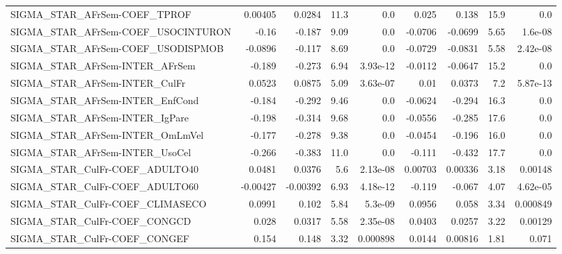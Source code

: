 \begin{tabular}{lrrrrrrrr}
SIGMA\_STAR\_AFrSem-COEF\_TPROF          &     0.00405 &       0.0284 &    11.3 &      0.0 &      0.025 &       0.138 &         15.9 &           0.0 \\
SIGMA\_STAR\_AFrSem-COEF\_USOCINTURON    &       -0.16 &       -0.187 &    9.09 &      0.0 &    -0.0706 &     -0.0699 &         5.65 &       1.6e-08 \\
SIGMA\_STAR\_AFrSem-COEF\_USODISPMOB     &     -0.0896 &       -0.117 &    8.69 &      0.0 &    -0.0729 &     -0.0831 &         5.58 &      2.42e-08 \\
SIGMA\_STAR\_AFrSem-INTER\_AFrSem        &      -0.189 &       -0.273 &    6.94 & 3.93e-12 &    -0.0112 &     -0.0647 &         15.2 &           0.0 \\
SIGMA\_STAR\_AFrSem-INTER\_CulFr         &      0.0523 &       0.0875 &    5.09 & 3.63e-07 &       0.01 &      0.0373 &          7.2 &      5.87e-13 \\
SIGMA\_STAR\_AFrSem-INTER\_EnfCond       &      -0.184 &       -0.292 &    9.46 &      0.0 &    -0.0624 &      -0.294 &         16.3 &           0.0 \\
SIGMA\_STAR\_AFrSem-INTER\_IgPare        &      -0.198 &       -0.314 &    9.68 &      0.0 &    -0.0556 &      -0.285 &         17.6 &           0.0 \\
SIGMA\_STAR\_AFrSem-INTER\_OmLmVel       &      -0.177 &       -0.278 &    9.38 &      0.0 &    -0.0454 &      -0.196 &         16.0 &           0.0 \\
SIGMA\_STAR\_AFrSem-INTER\_UsoCel        &      -0.266 &       -0.383 &    11.0 &      0.0 &     -0.111 &      -0.432 &         17.7 &           0.0 \\
SIGMA\_STAR\_CulFr-COEF\_ADULTO40        &      0.0481 &       0.0376 &     5.6 & 2.13e-08 &    0.00703 &     0.00336 &         3.18 &       0.00148 \\
SIGMA\_STAR\_CulFr-COEF\_ADULTO60        &    -0.00427 &     -0.00392 &    6.93 & 4.18e-12 &     -0.119 &      -0.067 &         4.07 &      4.62e-05 \\
SIGMA\_STAR\_CulFr-COEF\_CLIMASECO       &      0.0991 &        0.102 &    5.84 &  5.3e-09 &     0.0956 &       0.058 &         3.34 &      0.000849 \\
SIGMA\_STAR\_CulFr-COEF\_CONGCD          &       0.028 &       0.0317 &    5.58 & 2.35e-08 &     0.0403 &      0.0257 &         3.22 &       0.00129 \\
SIGMA\_STAR\_CulFr-COEF\_CONGEF          &       0.154 &        0.148 &    3.32 & 0.000898 &     0.0144 &     0.00816 &         1.81 &         0.071 \\

\end{tabular}
